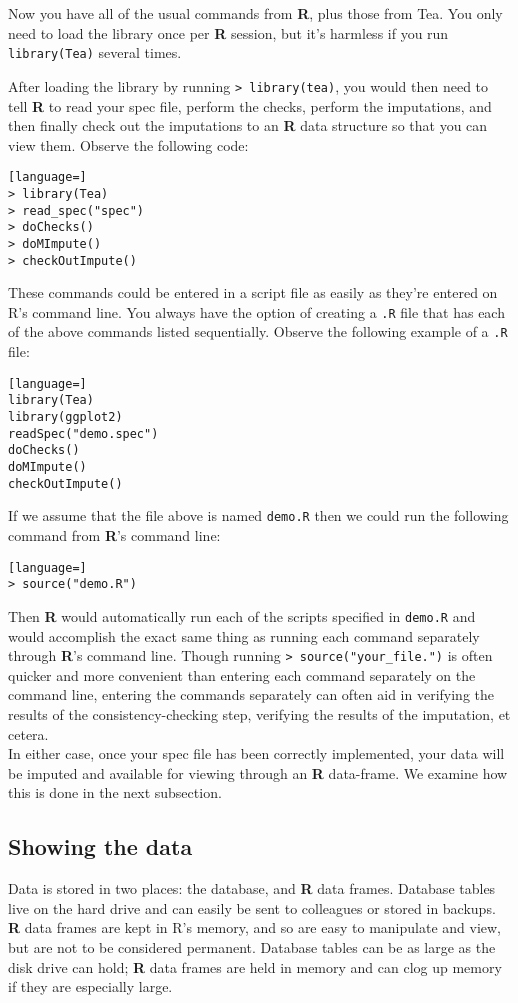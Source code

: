 \documentclass{article}
\begin{document}
Now you have all of the usual commands from \textbf{R}, plus those from Tea. You only
need to load the library once per \textbf{R} session, but it's harmless if you run
{\tt library(Tea)} several times.

After loading the library by running {\tt > library(tea)}, you would then need to 
tell \textbf{R} to read your spec file, perform the checks, perform the imputations, 
and then finally check out the imputations to an \textbf{R} data structure so that you 
can view them. Observe the following code:

\begin{lstlisting}[language=]
> library(Tea)
> read_spec("spec")
> doChecks()
> doMImpute()
> checkOutImpute()
\end{lstlisting}

These commands could be entered in a script file as easily as they're entered on R's command line.
You always have the option of creating a {\tt .R} file that has each of the above commands listed 
sequentially. Observe the following example of a {\tt .R} file:

\begin{lstlisting}[language=]
library(Tea)
library(ggplot2)
readSpec("demo.spec")
doChecks()
doMImpute()
checkOutImpute()
\end{lstlisting}

If we assume that the file above is named {\tt demo.R} then we could run the following command 
from \textbf{R}'s command line:

\begin{lstlisting}[language=]
> source("demo.R")
\end{lstlisting}

Then \textbf{R} would automatically run each of the scripts specified in {\tt demo.R} and would 
accomplish the exact same thing as running each command separately through \textbf{R}'s command line.
Though running {\tt > source("your\_file.")} is often quicker and more convenient than entering 
each command separately on the command line, entering the commands separately can often aid in 
verifying the results of the consistency-checking step, verifying the results of the imputation, 
et cetera.\\

In either case, once your spec file has been correctly implemented, your data will be 
imputed and available for viewing through an \textbf{R} data-frame.
We examine how this is done in the next subsection.

\subsection{Showing the data}
Data is stored in two places: the database, and \textbf{R} data frames. Database tables
live on the hard drive and can easily be sent to colleagues or stored in
backups. \textbf{R} data frames are kept in R's memory, and so are easy to manipulate and
view, but are not to be considered permanent. Database tables can be as large as
the disk drive can hold; \textbf{R} data frames are held in memory and can clog up memory if
they are especially large.
\end{document}
